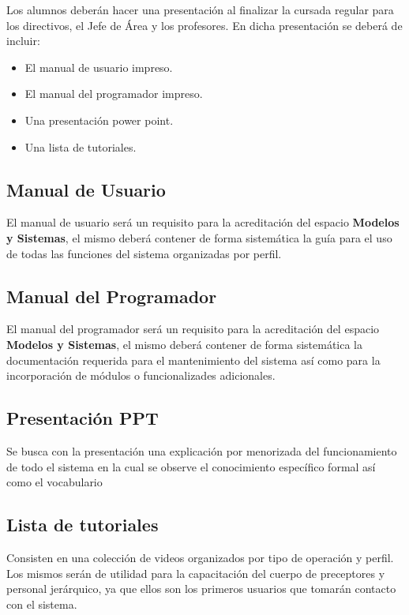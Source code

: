 Los alumnos deberán hacer una presentación al finalizar la cursada regular para los directivos, el Jefe de Área y los profesores. En dicha presentación se deberá de incluir:

\begin{itemize}
    \item El manual de usuario impreso.
    \item El manual del programador impreso.
    \item Una presentación power point.
    \item Una lista de tutoriales. 
\end{itemize}

\subsection{Manual de Usuario}

El manual de usuario será un requisito para la acreditación del espacio \textbf{Modelos y Sistemas}, el mismo deberá contener de forma sistemática la guía para el uso de todas las funciones del sistema organizadas por perfil.

\subsection{Manual del Programador}

El manual del programador será un requisito para la acreditación del espacio \textbf{Modelos y Sistemas}, el mismo deberá contener de forma sistemática la documentación requerida para el mantenimiento del sistema así como para la incorporación de módulos o funcionalizades adicionales.

\subsection{Presentación PPT}

Se busca con la presentación una explicación por menorizada del funcionamiento de todo el sistema en la cual se observe el conocimiento específico formal así como el vocabulario 

\subsection{Lista de tutoriales}

Consisten en una colección de videos organizados por tipo de operación y perfil. Los mismos serán de utilidad para la capacitación del cuerpo de preceptores y personal jerárquico, ya que ellos son los primeros usuarios que tomarán contacto con el sistema. 